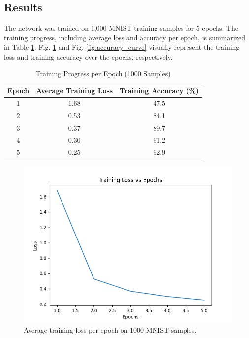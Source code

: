 \documentclass[conference]{IEEEtran}
\begin{document}
\subsection{Results}
The network was trained on 1,000 MNIST training samples for 5 epochs. The training progress, including average loss and accuracy per epoch, is summarized in Table \ref{tab:training_progress}. Fig. \ref{fig:loss_curve} and Fig. \ref{fig:accuracy_curve} visually represent the training loss and training accuracy over the epochs, respectively.

\begin{table}[htbp]
    \centering
    \caption{Training Progress per Epoch (1000 Samples)}
    \begin{tabular}{|c|c|c|}
        \hline
        \textbf{Epoch} & \textbf{Average Training Loss} & \textbf{Training Accuracy (\%)} \\
        \hline
        1 & 1.68 & 47.5 \\
        2 & 0.53 & 84.1 \\
        3 & 0.37 & 89.7 \\
        4 & 0.30 & 91.2 \\
        5 & 0.25 & 92.9 \\
        \hline
    \end{tabular}
    \label{tab:training_progress}
\end{table}


\begin{figure}[htbp]
    \centering
    \includegraphics[width=0.9\columnwidth]{loss_epochs.png}
    \caption{Average training loss per epoch on 1000 MNIST samples.}
    \label{fig:loss_curve}
\end{figure}
\end{document}
